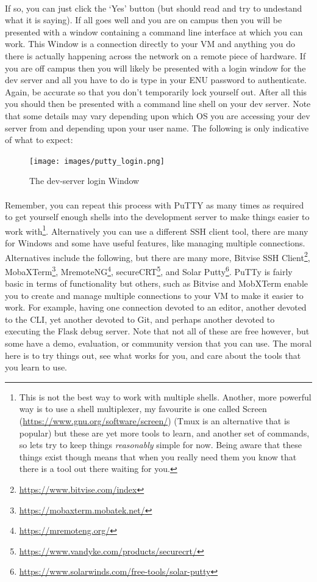\documentclass[12pt, a4paper, oneside]{book}
\begin{document}
\paragraph{} If so, you can just click the `Yes' button (but should read and try to undestand what it is saying). If all goes well and you are on campus then you will be presented with a window containing a command line interface at which you can work. This Window is a connection directly to your VM and anything you do there is actually happening across the network on a remote piece of hardware. If you are off campus then you will likely be presented with a login window for the dev server and all you have to do is type in your ENU password to authenticate. Again, be accurate so that you don't temporarily lock yourself out. After all this you should then be presented with a command line shell on your dev server. Note that some details may vary depending upon which OS you are accessing your dev server from and depending upon your user name. The following is only indicative of what to expect:

\begin{figure}[H]
\centering
\texttt{[image: images/putty\_login.png]}
\caption{The dev-server login Window}
\label{fig:dev-server-login-window}
\end{figure}

\paragraph{} Remember, you can repeat this process with PuTTY as many times as required to get yourself enough shells into the development server to make things easier to work with\footnote{This is not the best way to work with multiple shells. Another, more powerful way is to use a shell multiplexer, my favourite is one called Screen (\url{https://www.gnu.org/software/screen/}) (Tmux is an alternative that is popular) but these are yet more tools to learn, and another set of commands, so lets try to keep things \emph{reasonably} simple for now. Being aware that these things exist though means that when you really need them you know that there is a tool out there waiting for you.}. Alternatively you can use a different SSH client tool, there are many for Windows and some have useful features, like managing multiple connections. Alternatives include the following, but there are many more, Bitvise SSH Client\footnote{\url{https://www.bitvise.com/index}}, MobaXTerm\footnote{\url{https://mobaxterm.mobatek.net/}}, MremoteNG\footnote{\url{https://mremoteng.org/}}, secureCRT\footnote{\url{https://www.vandyke.com/products/securecrt/}}, and Solar Putty\footnote{\url{https://www.solarwinds.com/free-tools/solar-putty}}. PuTTy is fairly basic in terms of functionality but others, such as Bitvise and MobXTerm enable you to create and manage multiple connections to your VM to make it easier to work. For example, having one connection devoted to an editor, another devoted to the CLI, yet another devoted to Git, and perhaps another devoted to executing the Flask debug server. Note that not all of these are free however, but some have a demo, evaluation, or community version that you can use. The moral here is to try things out, see what works for you, and care about the tools that you learn to use.
\end{document}
